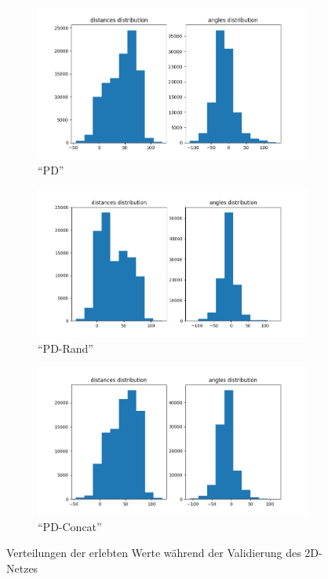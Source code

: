 \begin{figure}[H]
	\centering
	\begin{subfigure}[h]{0.5\textwidth}
		\centering
		\includegraphics[width=\linewidth]{kapitel5/images/eval/single-loss/pd-distr.png}
		\caption{``PD''}
		\label{2d-pd-val-distr}
	\end{subfigure}%
	\begin{subfigure}[h]{0.5\textwidth}
		\centering
		\includegraphics[width=\linewidth]{kapitel5/images/eval/single-loss/pd-rand-distr.png}
		\caption{``PD-Rand''}
		\label{2d-pd-rand-val-distr}
	\end{subfigure}
	\begin{subfigure}[h]{0.5\textwidth}
		\centering
		\includegraphics[width=\linewidth]{kapitel5/images/eval/single-loss/pd-concat-distr.png}
		\caption{``PD-Concat''}
		\label{2d-pd-concat-val-distr}
	\end{subfigure}
	\caption{Verteilungen der erlebten Werte während der Validierung des 2D-Netzes}
	\label{2d-val-distr}
\end{figure}

